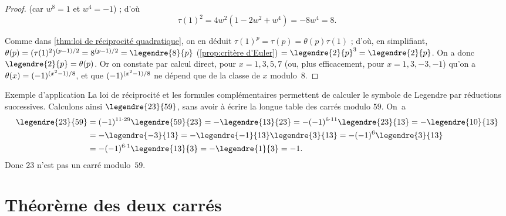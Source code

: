 \documentclass[11pt, %
  title in boldface,
  theorem in new line,
  theorem numbering = section,
  number theorems separately,
  simple name,
]{beaulivre}
\begin{document}
\begin{proof}
        (car \( w^8=1 \) et \( w^4=-1 \)) ; d'où
        \vspace{-.2\baselineskip}%
        \[
            \tau(1)^2 = 4w^2(1-2w^2+w^4) = -8w^4 = 8.
        \]
        \par\vspace{-.2\baselineskip}\noindent{}%
        Comme dans \cref{thm:loi de réciprocité quadratique}, on en déduit \( \tau(1)^p = \tau(p) = \theta(p)\tau(1) \) ; d'où, en simplifiant, \( \theta(p) = (\tau(1)^2)^{(p-1)/2} = 8^{(p-1)/2} = \legendre{8}{p} \) (\cref{prop:critère d'Euler}) \( = \legendre{2}{p}^3 = \legendre{2}{p} \). On a donc \( \legendre{2}{p} = \theta(p) \). Or on constate par calcul direct, pour \( x = 1,3,5,7 \) (ou, plus efficacement, pour \( x = 1,3,-3,-1 \)) qu'on a \( \theta(x) = (-1)^{\smash{(x^2-1)}/8} \), et que \( (-1)^{\smash{(x^2-1)}/8} \) ne dépend que de la classe de \( x \) modulo~\( 8 \).
    \end{proof}

    \begin{theorem-with-name}{Exemple d'application}
        La loi de réciprocité et les formules complémentaires permettent de calculer le symbole de Legendre par réductions successives. Calculons ainsi \( \legendre{23}{59} \), sans avoir à écrire la longue table des carrés modulo \( 59 \). On~a
        \begin{align*}
            \legendre{23}{59} &= (-1)^{11 \cdot 29}\legendre{59}{23} = - \legendre{13}{23} = -(-1)^{6 \cdot 11} \legendre{23}{13} = - \legendre{10}{13}\\
            &= -\legendre{-3}{13} = -\legendre{-1}{13} \legendre{3}{13} = -(-1)^6 \legendre{3}{13}\\
            &= - (-1)^{6 \cdot 1} \legendre{13}{3} = -\legendre{1}{3} = -1.
        \end{align*}
        Donc \( 23 \) n'est pas un carré modulo~\( 59 \).
    \end{theorem-with-name}

\section{Théorème des deux carrés}\label{sec:théorème des deux carrés}
\end{document}
